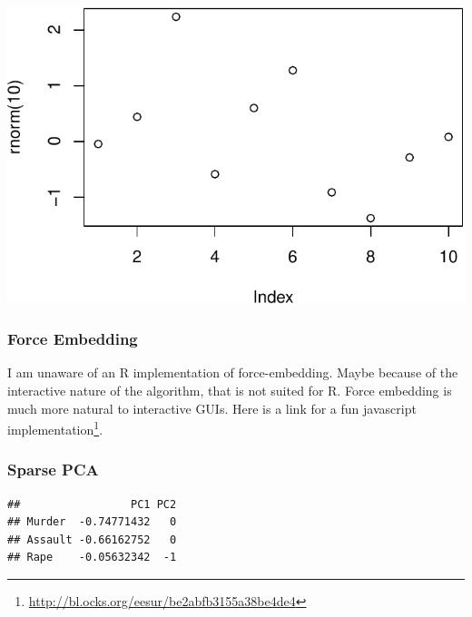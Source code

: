 \documentclass[]{book}
\newenvironment{Shaded}{\begin{snugshade}}{\end{snugshade}}
\newcommand{\CommentTok}[1]{\textcolor[rgb]{0.56,0.35,0.01}{\textit{#1}}}
\newcommand{\DataTypeTok}[1]{\textcolor[rgb]{0.13,0.29,0.53}{#1}}
\newcommand{\DecValTok}[1]{\textcolor[rgb]{0.00,0.00,0.81}{#1}}
\newcommand{\FloatTok}[1]{\textcolor[rgb]{0.00,0.00,0.81}{#1}}
\newcommand{\KeywordTok}[1]{\textcolor[rgb]{0.13,0.29,0.53}{\textbf{#1}}}
\newcommand{\NormalTok}[1]{#1}
\newcommand{\OperatorTok}[1]{\textcolor[rgb]{0.81,0.36,0.00}{\textbf{#1}}}
\newcommand{\OtherTok}[1]{\textcolor[rgb]{0.56,0.35,0.01}{#1}}
\newcommand{\StringTok}[1]{\textcolor[rgb]{0.31,0.60,0.02}{#1}}
\renewcommand{\href}[2]{#2\footnote{\url{#1}}}
\theoremstyle{definition}
\theoremstyle{definition}
\theoremstyle{definition}
\theoremstyle{remark}
\begin{document}
\includegraphics[width=0.5\linewidth]{Rcourse_files/figure-latex/unnamed-chunk-258-1}

\hypertarget{force-embedding}{%
\subsubsection{Force Embedding}\label{force-embedding}}

I am unaware of an R implementation of force-embedding.
Maybe because of the interactive nature of the algorithm, that is not suited for R.
Force embedding is much more natural to interactive GUIs.
Here is a link for a fun \href{http://bl.ocks.org/eesur/be2abfb3155a38be4de4}{javascript implementation}.

\hypertarget{sparse-pca}{%
\subsubsection{Sparse PCA}\label{sparse-pca}}

\begin{Shaded}
\end{Shaded}

\begin{verbatim}
##                 PC1 PC2
## Murder  -0.74771432   0
## Assault -0.66162752   0
## Rape    -0.05632342  -1
\end{verbatim}
\end{document}
